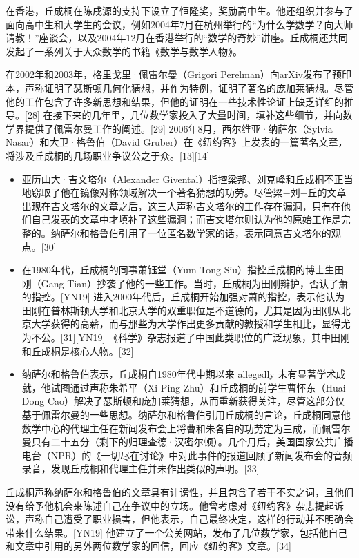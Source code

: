 在香港，丘成桐在陈戌源的支持下设立了恒隆奖，奖励高中生。他还组织并参与了面向高中生和大学生的会议，例如2004年7月在杭州举行的“为什么学数学？向大师请教！”座谈会，以及2004年12月在香港举行的“数学的奇妙”讲座。丘成桐还共同发起了一系列关于大众数学的书籍《数学与数学人物》。

在2002年和2003年，格里戈里·佩雷尔曼（Grigori Perelman）向arXiv发布了预印本，声称证明了瑟斯顿几何化猜想，并作为特例，证明了著名的庞加莱猜想。尽管他的工作包含了许多新思想和结果，但他的证明在一些技术性论证上缺乏详细的推导。[28] 在接下来的几年里，几位数学家投入了大量时间，填补这些细节，并向数学界提供了佩雷尔曼工作的阐述。[29] 2006年8月，西尔维亚·纳萨尔（Sylvia Nasar）和大卫·格鲁伯（David Gruber）在《纽约客》上发表的一篇著名文章，将涉及丘成桐的几场职业争议公之于众。[13][14]
\begin{itemize}
\item 亚历山大·吉文塔尔（Alexander Givental）指控梁邦、刘克峰和丘成桐不正当地窃取了他在镜像对称领域解决一个著名猜想的功劳。尽管梁−刘−丘的文章出现在吉文塔尔的文章之后，这三人声称吉文塔尔的工作存在漏洞，只有在他们自己发表的文章中才填补了这些漏洞；而吉文塔尔则认为他的原始工作是完整的。纳萨尔和格鲁伯引用了一位匿名数学家的话，表示同意吉文塔尔的观点。[30]  
\item 在1980年代，丘成桐的同事萧钰堂（Yum-Tong Siu）指控丘成桐的博士生田刚（Gang Tian）抄袭了他的一些工作。当时，丘成桐为田刚辩护，否认了萧的指控。[YN19] 进入2000年代后，丘成桐开始加强对萧的指控，表示他认为田刚在普林斯顿大学和北京大学的双重职位是不道德的，尤其是因为田刚从北京大学获得的高薪，而与那些为大学作出更多贡献的教授和学生相比，显得尤为不公。[31][YN19] 《科学》杂志报道了中国此类职位的广泛现象，其中田刚和丘成桐是核心人物。[32]  
\item 纳萨尔和格鲁伯表示，丘成桐自1980年代中期以来 allegedly 未有显著学术成就，他试图通过声称朱希平（Xi-Ping Zhu）和丘成桐的前学生曹怀东（Huai-Dong Cao）解决了瑟斯顿和庞加莱猜想，从而重新获得关注，尽管这部分仅基于佩雷尔曼的一些思想。纳萨尔和格鲁伯引用丘成桐的言论，丘成桐同意他数学中心的代理主任在新闻发布会上将曹和朱各自的功劳定为三成，而佩雷尔曼只有二十五分（剩下的归理查德·汉密尔顿）。几个月后，美国国家公共广播电台（NPR）的《一切尽在讨论》中对此事件的报道回顾了新闻发布会的音频录音，发现丘成桐和代理主任并未作出类似的声明。[33]
\end{itemize}
丘成桐声称纳萨尔和格鲁伯的文章具有诽谤性，并且包含了若干不实之词，且他们没有给予他机会来陈述自己在争议中的立场。他曾考虑对《纽约客》杂志提起诉讼，声称自己遭受了职业损害，但他表示，自己最终决定，这样的行动并不明确会带来什么结果。[YN19] 他建立了一个公关网站，发布了几位数学家，包括他自己和文章中引用的另外两位数学家的回信，回应《纽约客》文章。[34]

